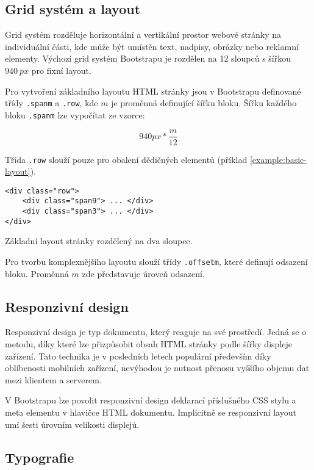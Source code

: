 \subsection{Grid systém a layout}

Grid systém rozděluje horizontální a vertikální prostor webové stránky na individuální části, kde může být umístěn text, nadpisy, obrázky nebo reklamní elementy. Výchozí grid systém Bootstrapu je rozdělen na 12 sloupců s šířkou $940~px$ pro fixní layout. \cite{19}

Pro vytvoření základního layoutu HTML stránky jsou v Bootstrapu definované třídy \texttt{.spanm} a \texttt{.row}, kde $m$ je proměnná definující šířku bloku. Šířku každého bloku \texttt{.spanm} lze vypočítat ze vzorce:

$$940px * \frac{m}{12}$$

Třída \texttt{.row} slouží pouze pro obalení dědičných elementů (příklad \ref{example:basic-layout}).

\begin{example}
    \centering
    \begin{lstlisting}
<div class="row">
    <div class="span9"> ... </div>
    <div class="span3"> ... </div>
</div>
    \end{lstlisting}
    \caption{Základní layout stránky rozdělený na dva sloupce.}
    \label{example:basic-layout}
\end{example}

Pro tvorbu komplexnějšího layoutu slouží třídy \texttt{.offsetm}, které definují odsazení bloku. Proměnná $m$ zde představuje úroveň odsazení.

\subsection{Responzivní design}

Responzivní design je typ dokumentu, který reaguje na své prostředí. Jedná se o metodu, díky které lze přizpůsobit obsah HTML stránky podle šířky displeje zařízení. Tato technika je v posledních letech populární především díky oblíbenosti mobilních zařízení, nevýhodou je nutnost přenosu vyššího objemu dat mezi klientem a serverem. \cite{6} \cite{15} \cite{19}

V Bootstrapu lze povolit responzivní design deklarací příslušného CSS stylu a meta elementu v hlavičce HTML dokumentu. Implicitně se responzivní layout umí  šesti úrovním velikosti displejů.

\subsection{Typografie}

